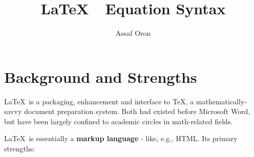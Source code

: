 \documentclass{article}
\newcommand{\tex}{\LaTeX \   }
\begin{document}
\title{\tex \  Equation Syntax}
\author{Assaf Oron}
\maketitle

\section{Background and Strengths}

\tex is a packaging, enhancement and interface to \TeX, a mathematically-savvy document preparation system. Both had existed before Microsoft Word, but have been largely confined to academic circles in math-related fields.

\tex is essentially a \textbf{markup language} - like, e.g., HTML. Its primary strengths:
\end{document}
